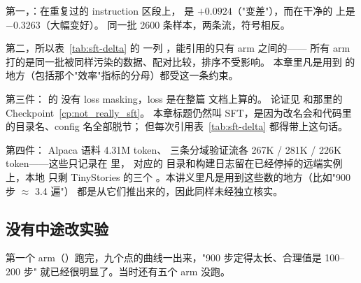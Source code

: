 第一，：在重复过的 instruction 区段上，
 是 $+0.0924$（"变差"），而在干净的
 上是 $-0.3263$（大幅变好）。
同一批 2600 条样本，两条流，符号相反。

第二，所以表~\ref{tab:sft-delta} 的  一列
，能引用的只有 arm 之间的——
所有 arm 打的是同一批被同样污染的数据、配对比较，排序不受影响。
本章里凡是用到  的地方（包括那个"效率"指标的分母）都受这一条约束。

第三件：  的 
没有 loss masking，loss 是在整篇  文档上算的。
论证见  和那里的 Checkpoint~\ref{cp:not_really_sft}。
本章标题仍然叫 SFT，是因为改名会和代码里的目录名、config 名全部脱节；
但每次引用表~\ref{tab:sft-delta} 都得带上这句话。

第四件： Alpaca 语料 4.31M token、
三条分域验证流各 267K / 281K / 226K token——这些只记录在  里，
对应的  目录和构建日志留在已经停掉的远端实例上，本地 
只剩 TinyStories 的三个 。本讲义里凡是用到这些数的地方（比如"900 步 $\approx$ 3.4 遍"）
都是从它们推出来的，因此同样未经独立核实。

\subsection{没有中途改实验}
\label{sec:b-sft-nochange}

第一个 arm（）跑完，九个点的曲线一出来，"900 步定得太长、合理值是 100--200 步"
就已经很明显了。当时还有五个 arm 没跑。

